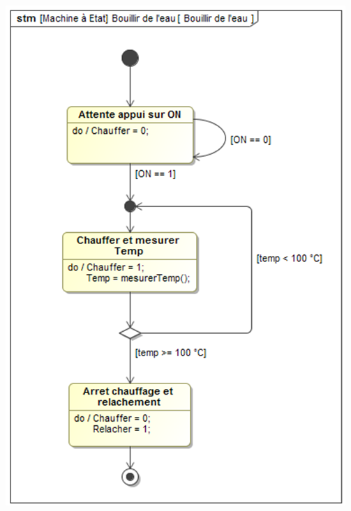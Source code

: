 \documentclass[10pt]{article}
\begin{document}
{\begin{center}
\includegraphics[width=.7\textwidth]{images/bouilloire_06}
\end{center}
}{}
\end{document}

